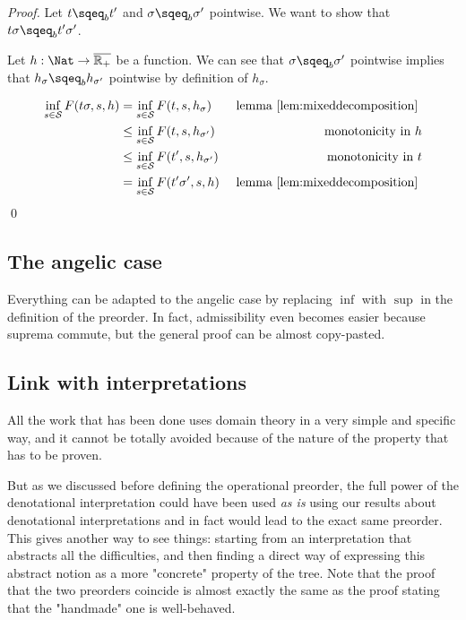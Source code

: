     \begin{proof}
        Let $t \sqeq_b t'$ and $\sigma \sqeq_b \sigma'$ pointwise.
        We want to show that $t\sigma \sqeq_b t' \sigma'$. 

        Let $h : \Nat \to \overline{\mathbb{R}_+}$ be a function.
        We can see that $\sigma \sqeq_b \sigma'$ pointwise 
        implies that $h_\sigma \sqeq_b h_{\sigma'}$ pointwise 
        by definition of $h_\sigma$.


        \begin{align*}
            \inf_{s \in \mathcal{S}} F(t\sigma, s, h)  
            &= \inf_{s \in \mathcal{S}} F(t, s, h_\sigma) 
            &\text{ lemma \ref{lem:mixeddecomposition} } \\
            &\leq \inf_{s \in \mathcal{S}} F(t, s, h_{\sigma'})  & \text{ monotonicity in } h\\
            &\leq \inf_{s \in \mathcal{S}} F(t',s, h_{\sigma'}) & \text{ monotonicity in } t \\
            &= \inf_{s \in \mathcal{S}} F(t'\sigma', s,h )
            &\text{ lemma \ref{lem:mixeddecomposition} } \\
        \end{align*}
    \qed
    \end{proof}

\subsection{The angelic case}

Everything can be adapted to the angelic case by replacing 
$\inf$ with $\sup$ in the definition of the preorder. In fact,
admissibility even becomes easier because suprema commute, 
but the general proof can be almost copy-pasted.

\subsection{Link with interpretations}

All the work that has been done uses domain theory in a very 
simple and specific way, and it cannot be totally avoided 
because of the nature of the property that has to be proven.

But as we discussed before defining the operational preorder,
the full power of the denotational interpretation could have 
been used \emph{as is} using our results about denotational
interpretations and in fact would lead to the exact same preorder.
This gives another way to see things: starting from 
an interpretation that abstracts all the difficulties,
and then finding a direct way of expressing this 
abstract notion as a more "concrete" property of the tree.
Note that the proof that the two preorders coincide 
is almost exactly the same as the proof stating that 
the "handmade" one is well-behaved.


